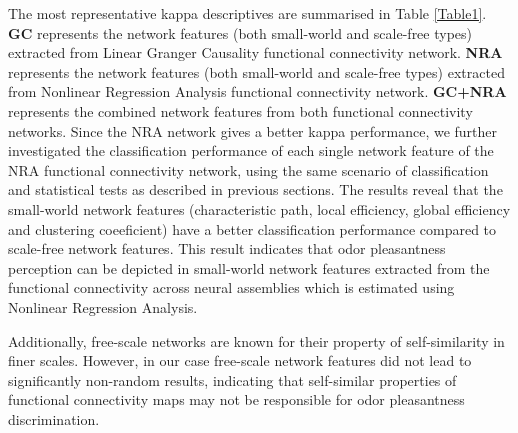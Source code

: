 %
%
The most representative kappa descriptives are summarised in Table \ref{Table1}. \textbf{GC} represents the network features (both small-world and scale-free types) extracted from Linear Granger Causality functional connectivity network. \textbf{NRA} represents the network features (both small-world and scale-free types) extracted from Nonlinear Regression Analysis functional connectivity network. \textbf{GC+NRA} represents the combined network features from both functional connectivity networks. Since the NRA network gives a better kappa performance, we further investigated the classification performance of each single network feature of the NRA functional connectivity network, using the same scenario of classification and statistical tests as described in previous sections. The results reveal that the small-world network features (characteristic path, local efficiency, global efficiency and clustering coeeficient) have a better classification performance compared to scale-free network features. This result indicates that odor pleasantness perception can be depicted in small-world network features extracted from the functional connectivity across neural assemblies which is estimated using Nonlinear Regression Analysis. 

Additionally, free-scale networks are known for their property of self-similarity in finer scales. However, in our case free-scale network features did not lead to significantly non-random results, indicating that self-similar properties of functional connectivity maps may not be responsible for odor pleasantness discrimination. 

